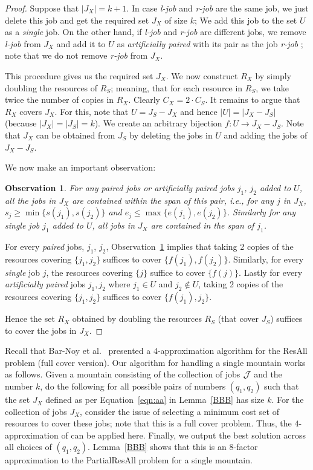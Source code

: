 \documentclass[11pt]{article}
\newtheorem{observation}[theorem]{Observation}
\newtheorem{proof}[theorem]{Proof}
\newcommand{\J}{{\cal J}}
\newcommand{\ResAll} {{\sc ResAll}}
\newcommand{\PResAll}{{\sc PartialResAll}}
\newcommand{\ljob}{{\em l-job}}
\newcommand{\rjob}{{\em r-job}}
\begin{document}
\begin{proof}
Suppose that $|J_X|=k+1$.
In case {\ljob} and {\rjob} are the same job, we just delete this job and get the required set $J_X$ of size $k$;
We add this job to the set $U$ as a {\em single} job.
On the other hand, if {\ljob} and {\rjob} are different jobs,
we remove {\ljob} from $J_X$ and add it to $U$ as {\em artificially paired} with
its pair as the job {\rjob} ; note that we do not remove {\rjob} from $J_X$.

This procedure gives us the required set $J_X$.
We now construct $R_X$ by simply doubling the resources of $R_S$; meaning, that for each 
resource in $R_S$, we take twice the number of copies in $R_X$. 
Clearly $C_X = 2 \cdot C_S$.
It remains to argue that $R_X$ covers $J_X$.
For this, note that $U=J_S-J_X$ and hence $|U|=|J_X-J_S|$ (because $|J_X|=|J_S|=k$).
We create an arbitrary bijection $f : U \rightarrow J_X-J_S$.
Note that $J_X$ can be obtained from $J_S$ by deleting the jobs in $U$ and adding the jobs of $J_X - J_S$.

We now make an important observation:
\begin{observation}
\label{obs1}
For any {\em paired} jobs or {\em artificially paired} jobs $j_1$, $j_2$ added to $U$, 
all the jobs in $J_X$ are contained within the
span of this pair, i.e., for any $j$ in $J_X$, $s_j \ge \min \{ s({j_1}), s({j_2}) \}$ and $e_j \le \max \{ e({j_1}), e({j_2}) \}$.
Similarly for any {\em single} job $j_1$ added to $U$, all jobs in $J_X$ are contained in the span of $j_1$.
\end{observation}

For every {\em paired} jobs, $j_1$, $j_2$, Observation~\ref{obs1} implies that taking 2 copies of the 
resources covering $\{ j_1, j_2 \}$ suffices to cover $\{ f({j_1}), f({j_2}) \}$.
Similarly, for every {\em single} job $j$, the resources covering $\{ j \}$ suffice to cover $\{ f(j) \}$.
Lastly for every {\em artificially paired} jobs $j_1, j_2$ where $j_1 \in U$ and $j_2 \notin U$, taking 2 copies
of the resources covering $\{ j_1, j_2 \}$ suffices to cover $\{ f({j_1}), j_2 \}$.

Hence the set $R_X$ obtained by doubling the resources $R_S$ (that cover $J_S$) suffices to cover the jobs in $J_X$.
\end{proof}

Recall that Bar-Noy et al.~\cite{Bar-Noy} presented a $4$-approximation algorithm for 
the {\ResAll} problem (full cover version). Our algorithm for handling a single mountain works
as follows. 
Given a mountain consisting of the collection of jobs $\J$ and the number $k$, 
do the following for all possible pairs of numbers $(q_1, q_2)$ such that the set 
$J_X$ defined as per Equation~\ref{eqn:aa} in Lemma~\ref{BBB} has size $k$.
For the collection of jobs $J_X$, consider the issue of selecting a minimum cost set of 
resources to cover these jobs; note that this is a full cover problem. Thus, the $4$-approximation
of \cite{Bar-Noy} can be applied here. 
Finally, we output the best solution across 
all choices of $(q_1, q_2)$.  Lemma~\ref{BBB} shows that this is an $8$-factor approximation
to the {\PResAll} problem for a single mountain. 
\end{document}
